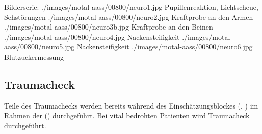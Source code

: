 

\begin{PictureSeriesWide}{}{Bilderserie: 
}
{./images/motal-aass/00800/neuro1.jpg}
{Pupillenreaktion, Lichtscheue, Sehstörungen }
{./images/motal-aass/00800/neuro2.jpg}
{Kraftprobe an den Armen}
{./images/motal-aass/00800/neuro3b.jpg}
{Kraftprobe an den Beinen}
{}
{}
{./images/motal-aass/00800/neuro4.jpg}
{Nackensteifigkeit}
{./images/motal-aass/00800/neuro5.jpg}
{Nackensteifigkeit}
{./images/motal-aass/00800/neuro6.jpg}
{Blutzuckermessung}
{}
{}
\end{PictureSeriesWide}



\clearpage %
\subsection{Traumacheck}
\label{topic:traumacheck}

Teile des Traumachecks werden bereits während des
Einschätzungsblockes
(\CO{[PAM]}, ) im
Rahmen der 
() durchgeführt. 
Bei vital bedrohten Patienten wird
 Traumacheck durchgeführt. 

